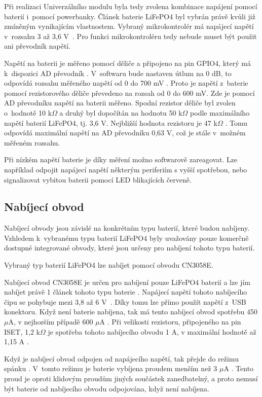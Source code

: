Při realizaci Univerzálního modulu byla tedy zvolena kombinace napájení pomocí baterií i~pomocí powerbanky. Článek baterie LiFePO4 byl vybrán právě kvůli již zmíněným 
vynikajícím vlastnostem. Vybraný mikrokontrolér má napájecí napětí v~rozsahu 3 až 3,6 V~\cite{ESP_C3_dtsh}. Pro funkci mikrokontroléru tedy nebude muset být použit ani 
převodník napětí. 

Napětí na baterii je měřeno pomocí děliče a připojeno na pin GPIO4, který má k~dispozici AD převodník \cite{ESP_C3_dtsh}. V~softwaru bude nastaven útlum na 0 dB, to 
odpovídá rozsahu měřeného napětí od 0 do 700 mV \cite{ESP_C3_tech_ref}.
Proto je napětí z~baterie pomocí rezistorového děliče převedeno na rozsah od 0 do 600 mV. Zde je pomocí AD převodníku napětí na baterii měřeno. Spodní rezistor děliče byl
zvolen o~hodnotě 10 k$\Omega$ a druhý byl dopočítán na hodnotu 50 k$\Omega$ podle maximálního napětí baterií LiFePO4, tj. 3,6 V. Nejbližší hodnota rezistoru je 47 k$\Omega$
\cite{rezistorova_rada}. Tomu odpovídá maximální napětí na AD převodníku 0,63 V, což je stále v~možném měřeném rozsahu. 

Při nízkém napětí baterie je díky měření možno softwarově zareagovat. Lze například odpojit napájecí napětí některým periferiím s vyšší spotřebou, nebo signalizovat vybitou 
baterii pomocí LED blikajících červeně. 

\subsection{Nabíjecí obvod}
Nabíjecí obvody jsou závislé na konkrétním typu baterií, které budou nabíjeny. Vzhledem k~vybranému typu baterií LiFePO4 byly uvažovány pouze komerčně
dostupné integrované obvody, které jsou určeny pro nabíjení tohoto typu baterií. 

Vybraný typ baterií LiFePO4 lze nabíjet pomocí obvodu CN3058E. 

Nabíjecí obvod CN3058E je určen pro nabíjení pouze LiFePO4 baterií a lze jím nabíjet právě 1 článek tohoto typu baterie \cite{charger_dtsh}. Napájecí napětí tohoto 
nabíjecího čipu se pohybuje mezi 3,8 až 6 V~\cite{charger_dtsh}. Díky tomu lze přímo použít napětí z~USB konektoru. Když není baterie nabíjena, tak má tento nabíjecí obvod 
spotřebu 450 $\mu$A, v nejhorším případě 600 $\mu$A \cite{charger_dtsh}. Při velikosti rezistoru, připojeného na pin ISET, 1,2 k$\Omega$ je spotřeba tohoto nabíjecího obvodu 
1 A, v maximální hodnotě až 1,15 A \cite{charger_dtsh}.

Když je nabíjecí obvod odpojen od napájecího napětí, tak přejde do režimu spánku \cite{charger_dtsh}. V~tomto režimu je baterie vybíjena proudem menším než 
3 $\mu$A \cite{charger_dtsh}. Tento proud je oproti klidovým proudům jiných součástek zanedbatelný, a proto nemusí být baterie od nabíjecího obvodu odpojována,
když není nabíjena. 

